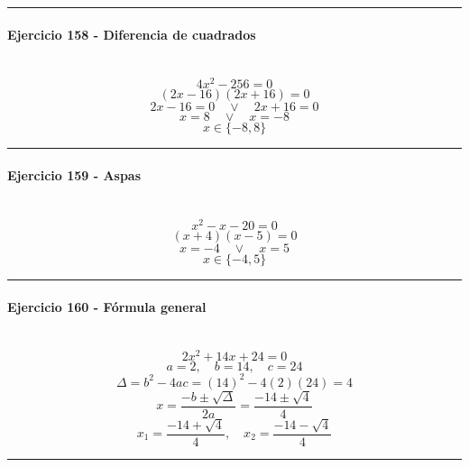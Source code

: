 \documentclass[10pt,a4paper]{article}
\newcommand{\res}[1]{\paragraph{#1}\mbox{}\\[-1.2em]}
\begin{document}
\vspace{1mm}\hrule\vspace{2mm}
\res{Ejercicio 158 - Diferencia de cuadrados}
\[ 4 x^{2} - 256=0 \]
\[ (2x-16)(2x+16)=0 \]
\[ 2x-16=0 \quad \vee \quad 2x+16=0 \]
\[ x=8 \quad \vee \quad x=-8 \]
\[ \boxed{x\in\{-8,8\}} \]
\vspace{1mm}\hrule\vspace{2mm}
\res{Ejercicio 159 - Aspas}
\[ x^{2} - x - 20=0 \]
\[ (x+4)(x-5)=0 \]
\[ x=-4 \quad \vee \quad x=5 \]
\[ \boxed{x\in\{-4,5\}} \]
\vspace{1mm}\hrule\vspace{2mm}
\res{Ejercicio 160 - Fórmula general}
\[ 2 x^{2} + 14 x + 24=0 \]
\[ a=2,\quad b=14,\quad c=24 \]
\[ \Delta=b^2-4ac=(14)^2-4(2)(24)=4 \]
\[ x=\frac{-b\pm\sqrt{\Delta}}{2a}=\frac{-14\pm\sqrt{4}}{4} \]
\[ \boxed{x_1=\frac{-14+\sqrt{4}}{4},\quad x_2=\frac{-14-\sqrt{4}}{4}} \]
\vspace{1mm}\hrule\vspace{2mm}
\end{document}
